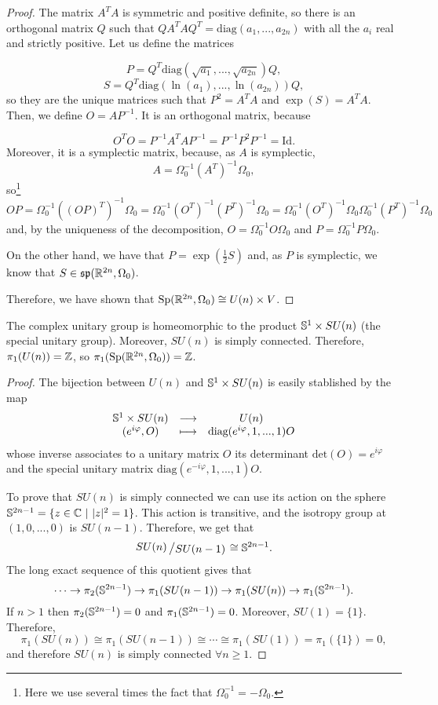 \begin{proof}
The matrix $A^TA$ is symmetric and positive definite, so there is an orthogonal matrix $Q$ such that $QA^TAQ^T = \text{diag}(a_1,...,a_{2n})$ with all the $a_i$ real and strictly positive. Let us define the matrices

\[P = Q^T\text{diag}(\sqrt{a_1},...,\sqrt{a_{2n}}) Q, \]
\[S = Q^T\text{diag}(\ln(a_1),...,\ln(a_{2n})) Q ,\]
so they are the unique matrices such that $P^2 = A^TA$ and $\exp(S) = A^TA$. Then, we define $O = AP^{-1}$. It is an orthogonal matrix, because

\[O^TO = P^{-1}A^TAP^{-1} = P^{-1} P^2 P^{-1} = \text{Id} .\]
Moreover, it is a symplectic matrix, because, as $A$ is symplectic,
\[A = \Omega_0^{-1} (A^T)^{-1} \Omega_0,\]
so\footnote{Here we use several times the fact that $\Omega_0^{-1} = -\Omega_0$.}
\[OP = \Omega_0^{-1}((OP)^T)^{-1} \Omega_0 = \Omega_0^{-1} (O^T)^{-1} (P^T)^{-1} \Omega_0 = \Omega_0^{-1} (O^T)^{-1} \Omega_0 \Omega_0^{-1} (P^T)^{-1} \Omega_0\]
and, by the uniqueness of the decomposition, $O = \Omega_0^{-1} O \Omega_0$ and $P = \Omega_0^{-1} P \Omega_0$.

On the other hand, we have that $P = \exp(\frac12 S)$ and, as $P$ is symplectic, we know that $S \in \mathfrak{sp}(\mathbb{R}^{2n},\Omega_0)$.

Therefore, we have shown that $\text{Sp}(\mathbb{R}^{2n}, \Omega_0) \cong U(n) \times V$.
\end{proof}

\begin{prop}
The complex unitary group is homeomorphic to the product $\mathbb{S}^1 \times SU(n)$ (the special unitary group). Moreover, $SU(n)$ is simply connected. Therefore, $\pi_1(U(n)) = \mathbb{Z}$, so $\pi_1(\text{Sp}(\mathbb{R}^{2n},\Omega_0)) = \mathbb{Z}$.
\end{prop}

\begin{proof}
The bijection between $U(n)$ and $\mathbb{S}^1 \times SU(n)$ is easily stablished by the map
\[\begin{array}{ccc} \mathbb{S}^1 \times SU(n) & \longrightarrow & U(n) \\ (e^{i \varphi}, O) & \longmapsto & \text{diag}(e^{i \varphi},1,...,1) O \end{array}\]
whose inverse associates to a unitary matrix $O$ its determinant $\text{det}(O) = e^{i \varphi}$ and the special unitary matrix $\text{diag}(e^{-i \varphi},1,...,1) O$.

To prove that $SU(n)$ is simply connected we can use its action on the sphere $\mathbb{S}^{2n-1} = \{z \in \mathbb{C} \ | \ |z|^2 = 1\}$. This action is transitive, and the isotropy group at $(1,0,...,0)$ is $SU(n-1)$. Therefore, we get that
\[\quocient{SU(n)}{SU(n-1)} \cong \con{S}^{2n-1} .\]
The long exact sequence of this quotient gives that
\[\cdots \rightarrow \pi_2(\mathbb{S}^{2n-1}) \rightarrow \pi_1(SU(n-1)) \rightarrow \pi_1(SU(n)) \rightarrow \pi_1(\mathbb{S}^{2n-1}) .\]
If $n > 1$ then $\pi_2(\mathbb{S}^{2n-1}) = 0$ and $\pi_1(\mathbb{S}^{2n-1})=0$. Moreover, $SU(1)=\{1\}$. Therefore,
\[\pi_1(SU(n)) \cong \pi_1(SU(n-1)) \cong \cdots \cong \pi_1(SU(1)) = \pi_1(\{1\}) = 0,\]
and therefore $SU(n)$ is simply connected $\forall n \geq 1$.
\end{proof}

